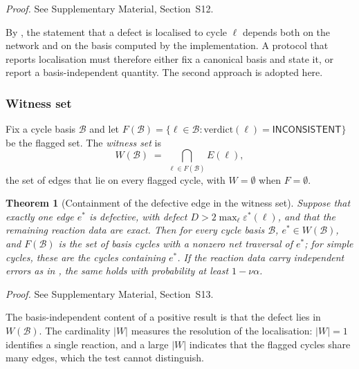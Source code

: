 \documentclass[11pt,a4paper]{article}
\theoremstyle{pstyle}
\newtheorem{theorem}{Theorem}[section]
\theoremstyle{definition}
\theoremstyle{remark}
\newcommand{\abs}[1]{\lvert#1\rvert}
\newcommand{\eps}{\varepsilon}
\newcommand{\epsstar}{\eps^{\ast}}
\begin{document}
\noindent\emph{Proof.} See Supplementary Material, Section~S12.

\begin{remark}
\label{rem:loc-consequence}
By , the statement that a defect is
localised to cycle $\ell$ depends both on the network and on the basis
computed by the implementation. A protocol that reports localisation
must therefore either fix a canonical basis and state it, or report a
basis-independent quantity. The second approach is adopted here.
\end{remark}

\subsubsection{Witness set}

\begin{definition}
\label{def:witness}
Fix a cycle basis $\mathcal{B}$ and let
$F(\mathcal{B}) = \{\ell\in\mathcal{B} :
\mathrm{verdict}(\ell)=\textsf{INCONSISTENT}\}$ be the flagged set. The
\emph{witness set} is
\begin{equation}
  W(\mathcal{B}) \;=\; \bigcap_{\ell\in F(\mathcal{B})} E(\ell),
  \label{eq:witness}
\end{equation}
the set of edges that lie on every flagged cycle, with
$W = \emptyset$ when $F=\emptyset$.
\end{definition}

\begin{theorem}[Containment of the defective edge in the witness set]
\label{thm:witness-contains}
Suppose that exactly one edge $e^{\ast}$ is defective, with defect $D >
2\max_\ell \epsstar(\ell)$, and that the remaining reaction data are
exact. Then for every cycle basis $\mathcal{B}$, $e^{\ast}\in
W(\mathcal{B})$, and $F(\mathcal{B})$ is the set of basis cycles with a
nonzero net traversal of $e^{\ast}$; for simple cycles, these are the
cycles containing $e^{\ast}$. If the reaction data carry independent
errors as in , the same holds with probability at
least $1-\nu\alpha$.
\end{theorem}

\noindent\emph{Proof.} See Supplementary Material, Section~S13.

\begin{corollary}
\label{cor:localise-witness}
The basis-independent content of a positive result is that the defect
lies in $W(\mathcal{B})$. The cardinality $\abs{W}$ measures the
resolution of the localisation: $\abs{W}=1$ identifies a single
reaction, and a large $\abs{W}$ indicates that the flagged cycles share
many edges, which the test cannot distinguish.
\end{corollary}
\end{document}

